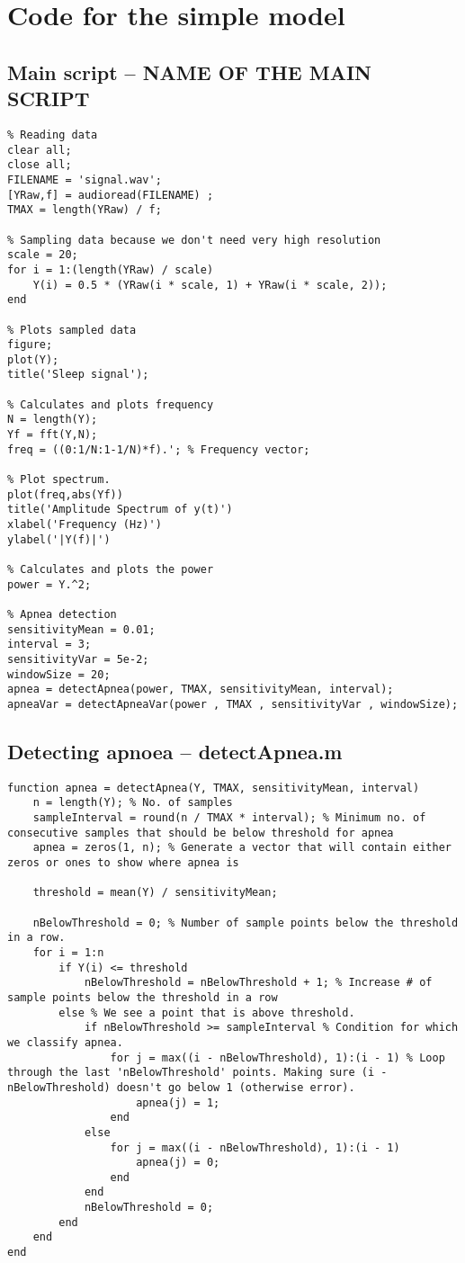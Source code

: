 \chapter{Code for the simple model}
\label{ch:simpleCode}

\section{Main script -- NAME OF THE MAIN SCRIPT}
\begin{lstlisting}
% Reading data
clear all;
close all;
FILENAME = 'signal.wav';
[YRaw,f] = audioread(FILENAME) ;
TMAX = length(YRaw) / f;

% Sampling data because we don't need very high resolution
scale = 20;
for i = 1:(length(YRaw) / scale)
    Y(i) = 0.5 * (YRaw(i * scale, 1) + YRaw(i * scale, 2));
end

% Plots sampled data
figure;
plot(Y);
title('Sleep signal');

% Calculates and plots frequency
N = length(Y);
Yf = fft(Y,N);
freq = ((0:1/N:1-1/N)*f).'; % Frequency vector;

% Plot spectrum.
plot(freq,abs(Yf)) 
title('Amplitude Spectrum of y(t)')
xlabel('Frequency (Hz)')
ylabel('|Y(f)|')

% Calculates and plots the power
power = Y.^2;

% Apnea detection
sensitivityMean = 0.01;
interval = 3;
sensitivityVar = 5e-2;
windowSize = 20;
apnea = detectApnea(power, TMAX, sensitivityMean, interval);
apneaVar = detectApneaVar(power , TMAX , sensitivityVar , windowSize);
\end{lstlisting}

\section{Detecting apnoea -- detectApnea.m}
\label{sec:detectApnea}
\begin{lstlisting}
function apnea = detectApnea(Y, TMAX, sensitivityMean, interval)
    n = length(Y); % No. of samples
    sampleInterval = round(n / TMAX * interval); % Minimum no. of consecutive samples that should be below threshold for apnea
    apnea = zeros(1, n); % Generate a vector that will contain either zeros or ones to show where apnea is
    
    threshold = mean(Y) / sensitivityMean;
    
    nBelowThreshold = 0; % Number of sample points below the threshold in a row.
	for i = 1:n
        if Y(i) <= threshold
            nBelowThreshold = nBelowThreshold + 1; % Increase # of sample points below the threshold in a row
        else % We see a point that is above threshold.
            if nBelowThreshold >= sampleInterval % Condition for which we classify apnea.
                for j = max((i - nBelowThreshold), 1):(i - 1) % Loop through the last 'nBelowThreshold' points. Making sure (i - nBelowThreshold) doesn't go below 1 (otherwise error).
                    apnea(j) = 1;
                end
            else
                for j = max((i - nBelowThreshold), 1):(i - 1)
                    apnea(j) = 0;
                end
            end
            nBelowThreshold = 0;
        end
    end
end
\end{lstlisting}

